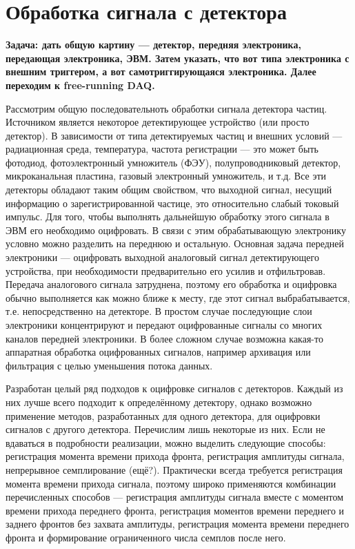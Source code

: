 \section{Обработка сигнала с детектора}\label{sec:secSignalProcessing}

\textbf{Задача: дать общую картину --- детектор, передняя электроника, передающая электроника, ЭВМ. Затем указать, что вот типа электроника с внешним триггером, а вот самотриггирующаяся электроника. Далее переходим к free-running DAQ.}

Рассмотрим общую последовательноть обработки сигнала детектора частиц. Источником является некоторое детектирующее устройство (или просто детектор). В зависимости от типа детектируемых частиц и внешних условий --- радиационная среда, температура, частота регистрации --- это может быть фотодиод, фотоэлектронный умножитель (ФЭУ), полупроводниковый детектор, микроканальная пластина, газовый электронный умножитель, и т.д. Все эти детекторы обладают таким общим свойством, что выходной сигнал, несущий информацию о зарегистрированной частице, это относительно слабый токовый импульс. Для того, чтобы выполнять дальнейшую обработку этого сигнала в ЭВМ его необходимо оцифровать.
В связи с этим обрабатывающую электронику условно можно разделить на переднюю и остальную. Основная задача передней электроники --- оцифровать выходной аналоговый сигнал детектирующего устройства, при необходимости предварительно его усилив и отфильтровав. Передача аналогового сигнала затруднена, поэтому его обработка и оцифровка обычно выполняется как можно ближе к месту, где этот сигнал выбрабатывается, т.е. непосредственно на детекторе. В простом случае последующие слои электроники концентрируют и передают оцифрованные сигналы со многих каналов передней электроники. В более сложном случае возможна какая-то аппаратная обработка оцифрованных сигналов, например архивация или фильтрация с целью уменьшения потока данных.

Разработан целый ряд подходов к оцифровке сигналов с детекторов. Каждый из них лучше всего подходит к определённому детектору, однако возможно применение методов, разработанных для одного детектора, для оцифровки сигналов с другого детектора. Перечислим лишь некоторые из них. Если не вдаваться в подробности реализации, можно выделить следующие способы: регистрация момента времени прихода фронта, регистрация амплитуды сигнала, непрерывное семплирование (ещё?). Практически всегда требуется регистрация момента времени прихода сигнала, поэтому широко применяются комбинации перечисленных способов --- регистрация амплитуды сигнала вместе с моментом времени прихода переднего фронта, регистрация моментов времени переднего и заднего фронтов без захвата амплитуды, регистрация момента времени переднего фронта и формирование ограниченного числа семплов после него.

